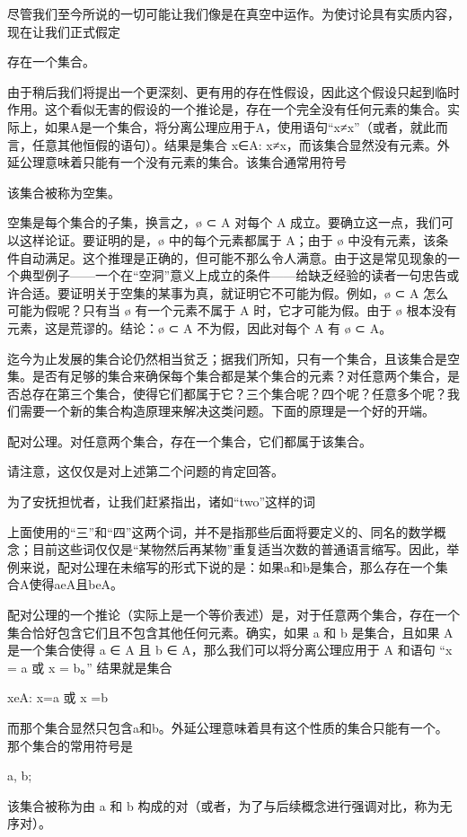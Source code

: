 \documentclass[12pt,a4paper]{ctexbook}
\theoremstyle{definition}
\theoremstyle{remark}
\begin{document}
尽管我们至今所说的一切可能让我们像是在真空中运作。为使讨论具有实质内容，现在让我们正式假定

存在一个集合。

由于稍后我们将提出一个更深刻、更有用的存在性假设，因此这个假设只起到临时作用。这个看似无害的假设的一个推论是，存在一个完全没有任何元素的集合。实际上，如果A是一个集合，将分离公理应用于A，使用语句“x≠x”（或者，就此而言，任意其他恒假的语句）。结果是集合 {x∈A: x≠x}，而该集合显然没有元素。外延公理意味着只能有一个没有元素的集合。该集合通常用符号

该集合被称为空集。

空集是每个集合的子集，换言之，ø ⊂ A 对每个 A 成立。要确立这一点，我们可以这样论证。要证明的是，ø 中的每个元素都属于 A；由于 ø 中没有元素，该条件自动满足。这个推理是正确的，但可能不那么令人满意。由于这是常见现象的一个典型例子——一个在“空洞”意义上成立的条件——给缺乏经验的读者一句忠告或许合适。要证明关于空集的某事为真，就证明它不可能为假。例如，ø ⊂ A 怎么可能为假呢？只有当 ø 有一个元素不属于 A 时，它才可能为假。由于 ø 根本没有元素，这是荒谬的。结论：ø ⊂ A 不为假，因此对每个 A 有 ø ⊂ A。

迄今为止发展的集合论仍然相当贫乏；据我们所知，只有一个集合，且该集合是空集。是否有足够的集合来确保每个集合都是某个集合的元素？对任意两个集合，是否总存在第三个集合，使得它们都属于它？三个集合呢？四个呢？任意多个呢？我们需要一个新的集合构造原理来解决这类问题。下面的原理是一个好的开端。

配对公理。对任意两个集合，存在一个集合，它们都属于该集合。

请注意，这仅仅是对上述第二个问题的肯定回答。

为了安抚担忧者，让我们赶紧指出，诸如“two”这样的词

上面使用的“三”和“四”这两个词，并不是指那些后面将要定义的、同名的数学概念；目前这些词仅仅是“某物然后再某物”重复适当次数的普通语言缩写。因此，举例来说，配对公理在未缩写的形式下说的是：如果a和b是集合，那么存在一个集合A使得aeA且beA。

配对公理的一个推论（实际上是一个等价表述）是，对于任意两个集合，存在一个集合恰好包含它们且不包含其他任何元素。确实，如果 a 和 b 是集合，且如果 A 是一个集合使得 a ∈ A 且 b ∈ A，那么我们可以将分离公理应用于 A 和语句 “x = a 或 x = b。” 结果就是集合

{xeA: x=a 或 x =b}

而那个集合显然只包含a和b。外延公理意味着具有这个性质的集合只能有一个。那个集合的常用符号是

{a, b};

该集合被称为由 a 和 b 构成的对（或者，为了与后续概念进行强调对比，称为无序对）。
\end{document}
